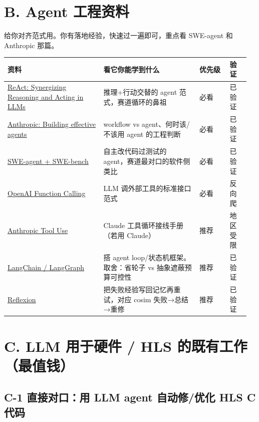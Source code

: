 \documentclass[12pt,a4paper]{ctexbook}
\begin{document}
\section{B. Agent 工程资料}

给你对齐范式用。你有落地经验，快速过一遍即可，重点看 SWE-agent 和 Anthropic 那篇。

{\small
\begin{longtable}{@{}L{0.38\linewidth}L{0.38\linewidth}L{0.12\linewidth}L{0.08\linewidth}@{}}
\toprule
\textbf{资料} & \textbf{看它你能学到什么} & \textbf{优先级} & \textbf{验证} \\
\midrule
\endhead
\href{https://arxiv.org/abs/2210.03629}{ReAct: Synergizing Reasoning and Acting in LLMs} & 推理+行动交替的 agent 范式，赛道循环的鼻祖 & 必看 & 已验证 \\
\href{https://www.anthropic.com/engineering/building-effective-agents}{Anthropic: Building effective agents} & workflow vs agent、何时该/不该用 agent 的工程判断 & 必看 & 已验证 \\
\href{https://github.com/princeton-nlp/SWE-agent}{SWE-agent + SWE-bench} & 自主改代码过测试的 agent，赛道最对口的软件侧类比 & 必看 & 已验证 \\
\href{https://platform.openai.com/docs/guides/function-calling}{OpenAI Function Calling} & LLM 调外部工具的标准接口范式 & 必看 & 反向爬 \\
\href{https://docs.anthropic.com/en/docs/build-with-claude/tool-use/overview}{Anthropic Tool Use} & Claude 工具循环接线手册（若用 Claude） & 推荐 & 地区受限 \\
\href{https://github.com/langchain-ai/langgraph}{LangChain / LangGraph} & 搭 agent loop/状态机框架。取舍：省轮子 vs 抽象遮蔽预算可控性 & 推荐 & 已验证 \\
\href{https://arxiv.org/abs/2303.11366}{Reflexion} & 把失败经验写回记忆再重试，对应 cosim 失败→总结→重修 & 推荐 & 已验证 \\
\bottomrule
\end{longtable}
}

\section{C. LLM 用于硬件 / HLS 的既有工作（最值钱）}

\subsection*{C-1  直接对口：用 LLM agent 自动修/优化 HLS C 代码}
\end{document}
